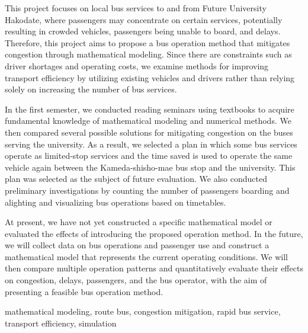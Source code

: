 \documentclass[openany,11pt,papersize,dvipdfm]{jsbook}
\begin{document}
\begin{eabstract}\setlength{\parindent}{1zw}%
\hspace{1zw}This project focuses on local bus services to and from Future University Hakodate, where passengers may concentrate on certain services, potentially resulting in crowded vehicles, passengers being unable to board, and delays. Therefore, this project aims to propose a bus operation method that mitigates congestion through mathematical modeling. Since there are constraints such as driver shortages and operating costs, we examine methods for improving transport efficiency by utilizing existing vehicles and drivers rather than relying solely on increasing the number of bus services.

In the first semester, we conducted reading seminars using textbooks to acquire fundamental knowledge of mathematical modeling and numerical methods. We then compared several possible solutions for mitigating congestion on the buses serving the university. As a result, we selected a plan in which some bus services operate as limited-stop services and the time saved is used to operate the same vehicle again between the Kameda-shisho-mae bus stop and the university. This plan was selected as the subject of future evaluation. We also conducted preliminary investigations by counting the number of passengers boarding and alighting and visualizing bus operations based on timetables.

At present, we have not yet constructed a specific mathematical model or evaluated the effects of introducing the proposed operation method. In the future, we will collect data on bus operations and passenger use and construct a mathematical model that represents the current operating conditions. We will then compare multiple operation patterns and quantitatively evaluate their effects on congestion, delays, passengers, and the bus operator, with the aim of presenting a feasible bus operation method.
\begin{ekeyword}
mathematical modeling, route bus, congestion mitigation, rapid bus service, transport efficiency, simulation
\end{ekeyword}
\end{eabstract}

\tableofcontents%

\mainmatter







\end{document}
